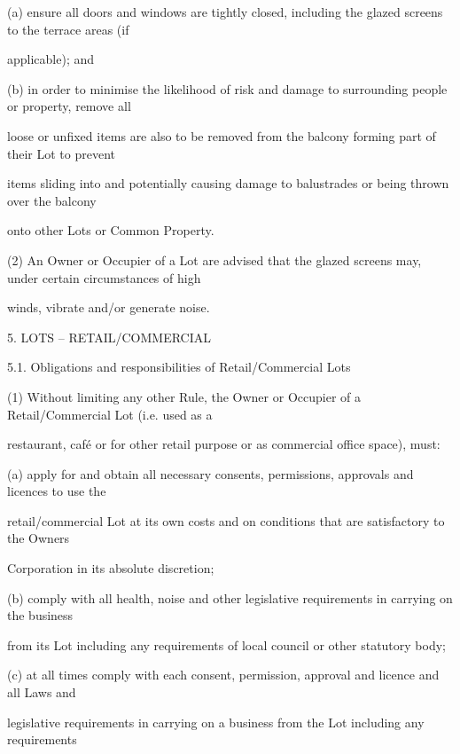 \documentclass{article}
\begin{document}
{\fontsize{9.962}{1}(a) ensure all doors and windows are tightly closed, including the glazed screens to the terrace areas (if }

{\fontsize{10.02}{1}applicable); and }

{\fontsize{9.962}{1}(b) in order to minimise the likelihood of risk and damage to surrounding people or property, remove all }

{\fontsize{10.02}{1}loose or unfixed items are also to be removed from the balcony forming part of their Lot to prevent }

{\fontsize{10.02}{1}items sliding into and potentially causing damage to balustrades or being thrown over the balcony }

{\fontsize{10.02}{1}onto other Lots or Common Property. }

{\fontsize{9.962}{1}(2) An Owner or Occupier of a Lot are advised that the glazed screens may, under certain circumstances of high }

{\fontsize{10.02}{1}winds, vibrate and/or generate noise. }


{\fontsize{9.99}{1}5. LOTS – RETAIL/COMMERCIAL }

{\fontsize{9.99}{1}5.1. Obligations and responsibilities of Retail/Commercial Lots }

{\fontsize{9.962}{1}(1) Without limiting any other Rule, the Owner or Occupier of a Retail/Commercial Lot (i.e. used as a }

{\fontsize{10.02}{1}restaurant, café or for other retail purpose or as commercial office space), must: }

{\fontsize{9.962}{1}(a) apply for and obtain all necessary consents, permissions, approvals and licences to use the }

{\fontsize{10.02}{1}retail/commercial Lot at its own costs and on conditions that are satisfactory to the Owners }

{\fontsize{10.02}{1}Corporation in its absolute discretion; }

{\fontsize{9.962}{1}(b) comply with all health, noise and other legislative requirements in carrying on the business }

{\fontsize{10.02}{1}from its Lot including any requirements of local council or other statutory body; }

{\fontsize{9.962}{1}(c) at all times comply with each consent, permission, approval and licence and all Laws and }

{\fontsize{10.02}{1}legislative requirements in carrying on a business from the Lot including any requirements }
\end{document}
